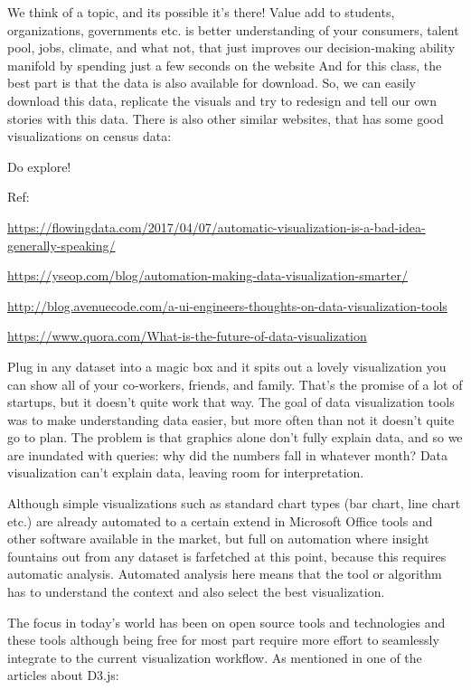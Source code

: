 \documentclass[]{book}
\theoremstyle{definition}
\theoremstyle{definition}
\theoremstyle{definition}
\theoremstyle{remark}
\begin{document}
We think of a topic, and its possible it's there! Value add to students,
organizations, governments etc. is better understanding of your
consumers, talent pool, jobs, climate, and what not, that just improves
our decision-making ability manifold by spending just a few seconds on
the website And for this class, the best part is that the data is also
available for download. So, we can easily download this data, replicate
the visuals and try to redesign and tell our own stories with this data.
There is also other similar websites, that has some good visualizations
on census data: \citep{CensusDataViz}

Do explore!

Ref:

\url{https://flowingdata.com/2017/04/07/automatic-visualization-is-a-bad-idea-generally-speaking/}

\url{https://yseop.com/blog/automation-making-data-visualization-smarter/}

\url{http://blog.avenuecode.com/a-ui-engineers-thoughts-on-data-visualization-tools}

\url{https://www.quora.com/What-is-the-future-of-data-visualization}

Plug in any dataset into a magic box and it spits out a lovely
visualization you can show all of your co-workers, friends, and family.
That's the promise of a lot of startups, but it doesn't quite work that
way. The goal of data visualization tools was to make understanding data
easier, but more often than not it doesn't quite go to plan. The problem
is that graphics alone don't fully explain data, and so we are inundated
with queries: why did the numbers fall in whatever month? Data
visualization can't explain data, leaving room for interpretation.

Although simple visualizations such as standard chart types (bar chart,
line chart etc.) are already automated to a certain extend in Microsoft
Office tools and other software available in the market, but full on
automation where insight fountains out from any dataset is farfetched at
this point, because this requires automatic analysis. Automated analysis
here means that the tool or algorithm has to understand the context and
also select the best visualization.

The focus in today's world has been on open source tools and
technologies and these tools although being free for most part require
more effort to seamlessly integrate to the current visualization
workflow. As mentioned in one of the articles about D3.js:
\end{document}

